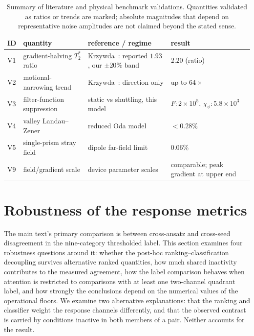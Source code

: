 \documentclass[aip,jap,reprint,onecolumn,superscriptaddress,longbibliography]{revtex4-2}
\begin{document}
\begin{table}[t]
\centering
\caption{Summary of literature and physical benchmark validations. Quantities
validated as ratios or trends are marked; absolute magnitudes that
depend on representative noise amplitudes are not claimed beyond the
stated sense.}
\label{tab:literature}
\begin{tabular}{llll}
\toprule
ID & quantity & reference / regime & result \\
\midrule
V1 & gradient-halving $T_2^\ast$ ratio & Krzywda~\cite{krzywda_coherence_2026}: reported $1.93$, our $\pm20\%$ band & $2.20$ (ratio) \\
V2 & motional-narrowing trend          & Krzywda~\cite{krzywda_coherence_2026}: direction only & up to $64\times$ \\
V3 & filter-function suppression       & static vs shuttling, this model & $F:2\times10^5$, $\chi_\phi:5.8\times10^3$ \\
V4 & valley Landau--Zener              & reduced Oda model~\cite{oda_suppressing_2026} & $<0.28\%$ \\
V5 & single-prism stray field          & dipole far-field limit       & $0.06\%$ \\
V9 & field/gradient scale              & device parameter scales~\cite{yoneda_quantum-dot_2018,unseld_baseband_2025,langrock_blueprint_2023} & comparable; peak gradient at upper end \\
\bottomrule
\end{tabular}
\end{table}

\section{Robustness of the response metrics}
\label{sec:robustness}
The main text's primary comparison is between cross-ansatz and cross-seed
disagreement in the nine-category thresholded label. This section examines four
robustness questions around it: whether the post-hoc ranking--classification
decoupling survives alternative ranked quantities, how much shared inactivity
contributes to the measured agreement, how the label comparison behaves when
attention is restricted to comparisons with at least one two-channel quadrant
label, and how strongly the conclusions depend on the numerical values of the
operational floors.
We examine two alternative explanations: that the ranking and classifier
weight the response channels differently, and that the observed contrast is
carried by conditions inactive in both members of a pair. Neither accounts for
the result.
\end{document}
